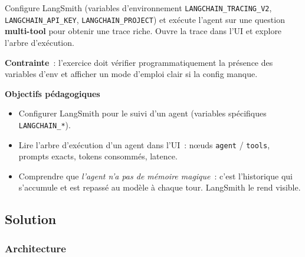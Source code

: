 \documentclass[11pt,a4paper]{article}
\begin{document}
\begin{tcolorbox}[title=Exercice bonus 2. Tracer la boucle ReAct dans l'UI LangSmith]
Configure LangSmith (variables d'environnement \texttt{LANGCHAIN\_TRACING\_V2},
\texttt{LANGCHAIN\_API\_KEY}, \texttt{LANGCHAIN\_PROJECT}) et exécute
l'agent sur une question \textbf{multi-tool} pour obtenir une trace
riche. Ouvre la trace dans l'UI et explore l'arbre d'exécution.

\textbf{Contrainte}~: l'exercice doit vérifier programmatiquement la
présence des variables d'env et afficher un mode d'emploi clair si la
config manque.

\bigskip
\noindent\textbf{Objectifs pédagogiques}
\begin{itemize}[leftmargin=*]
  \item Configurer LangSmith pour le suivi d'un agent (variables
        spécifiques \texttt{LANGCHAIN\_*}).
  \item Lire l'arbre d'exécution d'un agent dans l'UI~: nœuds
        \texttt{agent} / \texttt{tools}, prompts exacts, tokens
        consommés, latence.
  \item Comprendre que \emph{l'agent n'a pas de mémoire magique}~: c'est
        l'historique qui s'accumule et est repassé au modèle à chaque
        tour. LangSmith le rend visible.
\end{itemize}
\end{tcolorbox}

\subsection{Solution}

\subsubsection{Architecture}

\begin{center}
\end{center}
\end{document}

